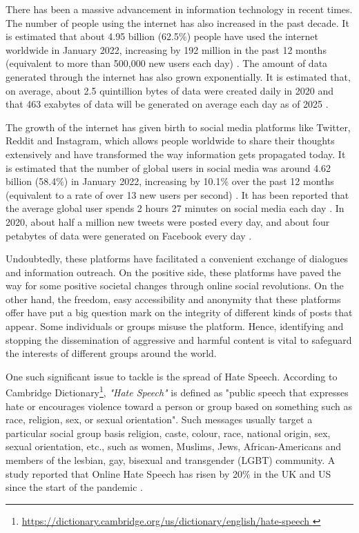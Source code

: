 There has been a massive advancement in information technology in recent times. The number of people using the internet has also increased in the past decade. It is estimated that about 4.95 billion (62.5\%) people have used the internet worldwide in January 2022, increasing by 192 million in the past 12 months (equivalent to more than 500,000 new users each day) \cite{datareportal_stats}. The amount of data generated through the internet has also grown exponentially. It is estimated that, on average, about 2.5 quintillion bytes of data were created daily in 2020 and that 463 exabytes of data will be generated on average each day as of 2025 \cite{techjury}.

The growth of the internet has given birth to social media platforms like Twitter, Reddit and Instagram, which allows people worldwide to share their thoughts extensively and have transformed the way information gets propagated today. It is estimated that the number of global users in social media was around 4.62 billion (58.4\%) in January 2022, increasing by 10.1\% over the past 12 months (equivalent to a rate of over 13 new users per second) \cite{datareportal_stats}. It has been reported that the average global user spends 2 hours 27 minutes on social media each day \cite{datareportal_stats}. In 2020, about half a million new tweets were posted every day, and about four petabytes of data were generated on Facebook every day \cite{techjury}.

Undoubtedly, these platforms have facilitated a convenient exchange of dialogues and information outreach. On the positive side, these platforms have paved the way for some positive societal changes through online social revolutions. On the other hand, the freedom, easy accessibility and anonymity that these platforms offer have put a big question mark on the integrity of different kinds of posts that appear. Some individuals or groups misuse the platform. Hence, identifying and stopping the dissemination of aggressive and harmful content is vital to safeguard the interests of different groups around the world.

One such significant issue to tackle is the spread of Hate Speech. According to Cambridge Dictionary\footnote{\url{https://dictionary.cambridge.org/us/dictionary/english/hate-speech
}}, \emph{"Hate Speech"} is defined as "public speech that expresses hate or encourages violence toward a person or group based on something such as race, religion, sex, or sexual orientation". Such messages usually target a particular social group basis religion, caste, colour, race, national origin, sex, sexual orientation, etc., such as women, Muslims, Jews, African-Americans and 
members of the lesbian, gay, bisexual and transgender (LGBT) community. A study reported that Online Hate Speech has risen by 20\% in the UK and US since the start of the pandemic \cite{baggs_2021}.

